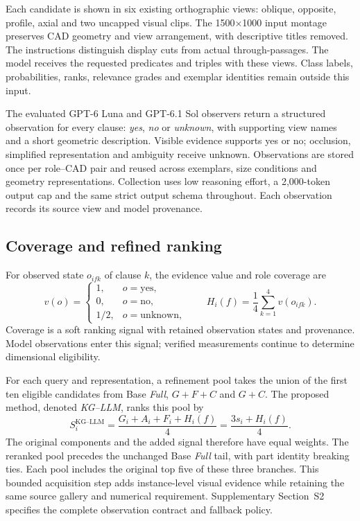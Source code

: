 \documentclass[10pt,a4paper,twocolumn]{article}
\newcommand{\Full}{\textit{Full}}
\newcommand{\Proposed}{\textit{KG--LLM}}
\begin{document}
Each candidate is shown in six existing orthographic views: oblique, opposite, profile, axial and two uncapped visual clips. The 1500$\times$1000 input montage preserves CAD geometry and view arrangement, with descriptive titles removed. The instructions distinguish display cuts from actual through-passages. The model receives the requested predicates and triples with these views. Class labels, probabilities, ranks, relevance grades and exemplar identities remain outside this input.

The evaluated GPT-6 Luna and GPT-6.1 Sol observers return a structured observation for every clause: \textit{yes}, \textit{no} or \textit{unknown}, with supporting view names and a short geometric description. Visible evidence supports yes or no; occlusion, simplified representation and ambiguity receive unknown. Observations are stored once per role--CAD pair and reused across exemplars, size conditions and geometry representations. Collection uses low reasoning effort, a 2,000-token output cap and the same strict output schema throughout. Each observation records its source view and model provenance.

\subsection{Coverage and refined ranking}

For observed state $o_{ifk}$ of clause $k$, the evidence value and role coverage are
\begin{equation}
v(o)=\begin{cases}1,&o=\mathrm{yes},\\0,&o=\mathrm{no},\\1/2,&o=\mathrm{unknown},\end{cases}
\qquad H_i(f)=\frac14\sum_{k=1}^{4}v(o_{ifk}).\label{eq:coverage}
\end{equation}
Coverage is a soft ranking signal with retained observation states and provenance. Model observations enter this signal; verified measurements continue to determine dimensional eligibility.

For each query and representation, a refinement pool takes the union of the first ten eligible candidates from Base \Full, $G+F+C$ and $G+C$. The proposed method, denoted \Proposed, ranks this pool by
\begin{equation}
S_i^{\mathrm{KG\mbox{--}LLM}}=\frac{G_i+A_i+F_i+H_i(f)}4
=\frac{3s_i+H_i(f)}4.\label{eq:refined}
\end{equation}
The original components and the added signal therefore have equal weights. The reranked pool precedes the unchanged Base \Full{} tail, with part identity breaking ties. Each pool includes the original top five of these three branches. This bounded acquisition step adds instance-level visual evidence while retaining the same source gallery and numerical requirement. Supplementary Section~S2 specifies the complete observation contract and fallback policy.
\end{document}
